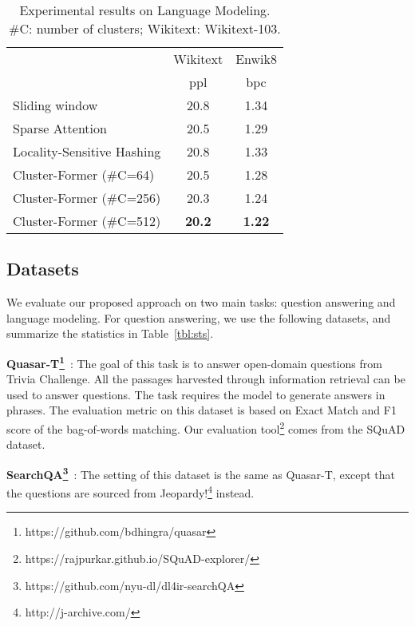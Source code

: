 \documentclass[11pt,a4paper]{article}
\begin{document}
\begin{table}[t]
\begin{tabular}{lcc}
\toprule
                           & Wikitext & Enwik8\\
                           & ppl         & bpc    \\
\midrule

Sliding window       & 20.8        & 1.34   \\
Sparse Attention    & 20.5        & 1.29   \\
Locality-Sensitive Hashing   & 20.8        & 1.33   \\
\midrule
Cluster-Former (\#C=64)    & 20.5        & 1.28   \\
Cluster-Former (\#C=256)   & 20.3        & 1.24   \\
Cluster-Former (\#C=512)   & \textbf{20.2}        & \textbf{1.22}  \\
\bottomrule
\end{tabular}
\caption{Experimental results on Language Modeling.  \#C: number of clusters;  Wikitext: Wikitext-103.}
\label{tbl:lm}
\end{table}


\subsection{Datasets}
We evaluate our proposed approach on two main tasks: question answering and language modeling.
For question answering, we use the following datasets, and summarize the statistics in Table~\ref{tbl:sts}.

\vspace{5pt}
\noindent\textbf{Quasar-T\footnote{https://github.com/bdhingra/quasar}}~\cite{dhingra2017quasar}: The goal of this task is to answer open-domain questions from Trivia Challenge. All the passages harvested through information retrieval can be used to answer questions. The task requires the model to generate answers in phrases. The evaluation metric on this dataset is based on Exact Match and F1 score of the bag-of-words matching. Our evaluation tool\footnote{https://rajpurkar.github.io/SQuAD-explorer/} comes from the SQuAD dataset.

\vspace{5pt}
\noindent\textbf{SearchQA\footnote{https://github.com/nyu-dl/dl4ir-searchQA}}~\cite{dunn2017searchqa}: The setting of this dataset is the same as Quasar-T, except that the questions are sourced from Jeopardy!\footnote{http://j-archive.com/} instead.
\end{document}
